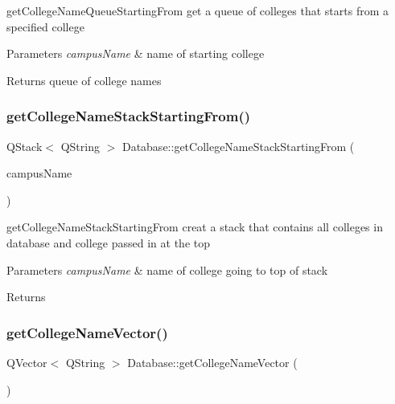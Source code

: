 get\+College\+Name\+Queue\+Starting\+From get a queue of colleges that starts from a specified college 


\begin{DoxyParams}{Parameters}
{\em campus\+Name} & name of starting college \\
\hline
\end{DoxyParams}
\begin{DoxyReturn}{Returns}
queue of college names 
\end{DoxyReturn}
\mbox{\label{class_database_a72407a60cb8936fecbbe8f4ba694b913}} 
\subsubsection{\texorpdfstring{get\+College\+Name\+Stack\+Starting\+From()}{getCollegeNameStackStartingFrom()}}
{\footnotesize\ttfamily Q\+Stack$<$ Q\+String $>$ Database\+::get\+College\+Name\+Stack\+Starting\+From (\begin{DoxyParamCaption}\item[{Q\+String}]{campus\+Name }\end{DoxyParamCaption})}



get\+College\+Name\+Stack\+Starting\+From creat a stack that contains all colleges in database and college passed in at the top 


\begin{DoxyParams}{Parameters}
{\em campus\+Name} & name of college going to top of stack \\
\hline
\end{DoxyParams}
\begin{DoxyReturn}{Returns}

\end{DoxyReturn}
\mbox{\label{class_database_a745e0e7d8279c576cd3672ba2f6375e1}} 
\subsubsection{\texorpdfstring{get\+College\+Name\+Vector()}{getCollegeNameVector()}}
{\footnotesize\ttfamily Q\+Vector$<$ Q\+String $>$ Database\+::get\+College\+Name\+Vector (\begin{DoxyParamCaption}{ }\end{DoxyParamCaption})}




